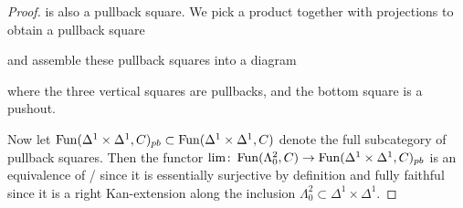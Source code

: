\begin{lemma}
\begin{proof}
        is also a pullback square.
        We pick a product together with projections to obtain a pullback square 
        \begin{center}
        \end{center}
        and assemble these pullback squares into a diagram
        \begin{center}
        \end{center}
        where the three vertical squares are pullbacks, and the bottom square is a pushout.

        Now let $\operatorname{Fun}(\Delta^1\times\Delta^1,C)_{pb}\subset\operatorname{Fun}(\Delta^1\times\Delta^1,C)$ denote the full subcategory of pullback squares.
        Then the functor $\lim\colon\operatorname{Fun}(\Lambda_0^2,C)\to\operatorname{Fun}(\Delta^1\times\Delta^1,C)_{pb}$ is an equivalence of \inftycats/ since it is essentially surjective by definition and fully faithful since it is a right Kan-extension along the inclusion $\Lambda_0^2\subset\Delta^1\times\Delta^1$.


\end{proof}
\end{lemma}
